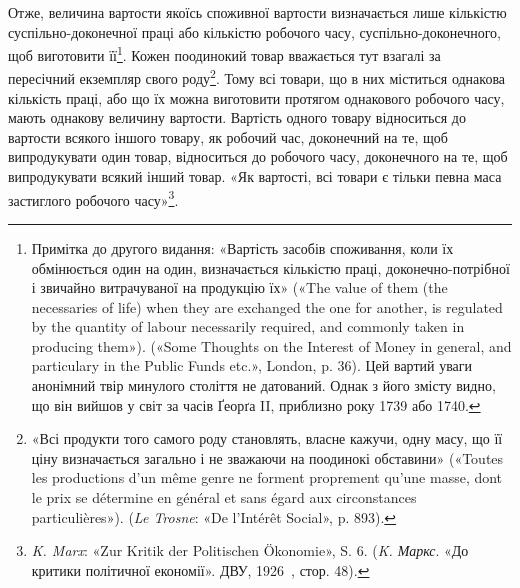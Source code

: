 Отже, величина вартости якоїсь споживної вартости визначається
лише кількістю суспільно-доконечної праці або кількістю
робочого часу, суспільно-доконечного, щоб виготовити
її\footnote{
Примітка до другого видання: «Вартість засобів споживання, коли
їх обмінюється один на один, визначається кількістю праці, доконечно-потрібної
і звичайно витрачуваної на продукцію їх» («The value of them
(the necessaries of life) when they are exchanged the one for another, is
regulated by the quantity of labour necessarily required, and commonly
taken in producing them»). («Some Thoughts on the Interest of Money in
general, and particulary in the Public Funds etc.», London, p. 36). Цей
вартий уваги анонімний твір минулого століття не датований. Однак
з його змісту видно, що він вийшов у світ за часів Ґеорґа II, приблизно
року 1739 або 1740.
}. Кожен поодинокий товар вважається тут взагалі за пересічний
екземпляр свого роду\footnote{
«Всі продукти того самого роду становлять, власне кажучи, одну
масу, що її ціну визначається загально і не зважаючи на поодинокі обставини»
(«Toutes les productions d’un même genre ne forment proprement
qu’une masse, dont le prix se détermine en général et sans égard aux circonstances
particulières»). (\emph{Le Trosne}: «De l’Intérêt Social», p. 893).
}. Тому всі товари, що в них міститься
однакова кількість праці, або що їх можна виготовити протягом
однакового робочого часу, мають однакову величину вартости.
Вартість одного товару відноситься до вартости всякого іншого
товару, як робочий час, доконечний на те, щоб випродукувати
один товар, відноситься до робочого часу, доконечного на те,
щоб випродукувати всякий інший товар. «Як вартості, всі товари
є тільки певна маса застиглого робочого часу»\footnote{
\emph{K. Marx}: «Zur Kritik der Politischen Ökonomie», S. 6. (\emph{K. Маркс}.
«До критики політичної економії». ДВУ, 1926~, стор. 48).
}.
